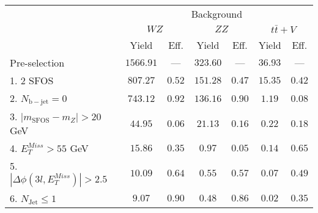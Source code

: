 \begin{tabular}{l||c|c||c|c||c|c}
\hline
 &       \multicolumn{6}{c}{Background} \\
 & \multicolumn{2}{c||}{$WZ$} & \multicolumn{2}{c||}{$ZZ$} & \multicolumn{2}{c}{$t\bar{t}+V$}  \\ 
 & Yield & Eff. & Yield & Eff. & Yield & Eff.  \\
\hline\hline
Pre-selection &  $1566.91$ & --- &  $323.60$ & --- &  $36.93$ & --- \\ 
\hline
1. 2 SFOS &  $807.27$ &  $0.52$ &  $151.28$ &  $0.47$ &  $15.35$ &  $0.42$  \\ 
\hline
2. $N_{\mathrm{b-jet}}=0$ &  $743.12$ &  $0.92$ &  $136.16$ &  $0.90$ &  $1.19$ &  $0.08$ \\ 
\hline
3. $| m_{\mathrm{SFOS}} - m_Z | >  20$ GeV &  $44.95$ &  $0.06$ &  $21.13$ &  $0.16$ &  $0.22$ &  $0.18$\\ 
\hline
4. $E_{T}^{Miss} > 55$ GeV &  $15.86$ &  $0.35$ &  $0.97$ &  $0.05$ &  $0.14$ &  $0.65$ \\ 
\hline
5. $|\Delta\phi(3l,E_{T}^{Miss})| > 2.5$ &  $10.09$ &  $0.64$ &  $0.55$ &  $0.57$ &  $0.07$ &  $0.49$ \\ 
\hline
6. $N_{\mathrm{Jet}} \leq 1$ &  $9.07$ &  $0.90$ &  $0.48$ &  $0.86$ &  $0.02$ &  $0.35$ \\ 
\hline
\end{tabular}

